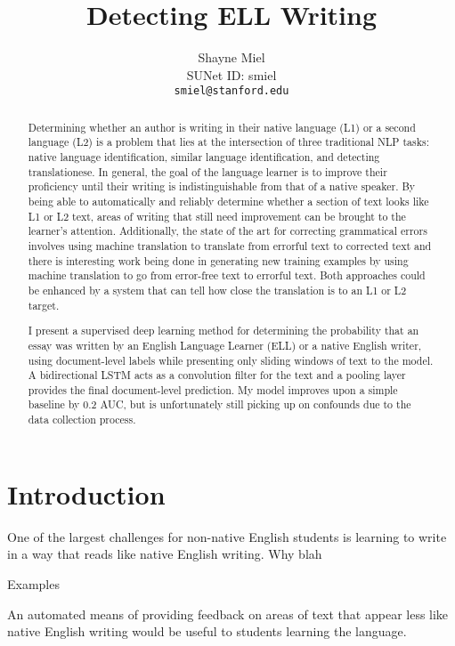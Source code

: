 \documentclass{article} %
\title{Detecting ELL Writing}
\author{
Shayne Miel \\
SUNet ID: smiel\\
\texttt{smiel@stanford.edu} \\
}
\begin{document}
\maketitle

\begin{abstract}
Determining whether an author is writing in their native language (L1) or a
second language (L2) is a problem that lies at the intersection of three
traditional NLP tasks: native language identification, similar language
identification, and detecting translationese.
In general, the goal of the language
learner is to improve their proficiency until their writing is indistinguishable
from that of a native speaker. By being able to automatically and reliably
determine whether a section of text looks like L1 or L2 text, areas of writing
that still need improvement can be brought to the learner's attention.
Additionally, the state of the art for correcting grammatical errors involves
using machine translation to translate from errorful text to corrected text\cite{chollampatt}
and there is interesting work being done in generating new training examples
by using machine translation to go
from error-free text to errorful text.\cite{liu} Both approaches could be enhanced by a
system that can tell how close the translation is to an L1 or L2 target.

I present a supervised deep learning method for determining the probability
that an essay was written by an English Language Learner (ELL) or a
native English writer, using document-level labels while presenting only sliding
windows of text to the model. A bidirectional LSTM acts as a convolution
filter for the text and a pooling layer provides the final document-level
prediction. My model improves upon a simple baseline by 0.2 AUC, but is
unfortunately still picking up on confounds due to the data collection process.
\end{abstract}

\section{Introduction}

One of the largest challenges for non-native English students is learning to
write in a way that reads like native English writing. Why blah

Examples

An automated means of providing feedback on areas of text that appear less
like native English writing would be useful to students learning the language.
\end{document}
